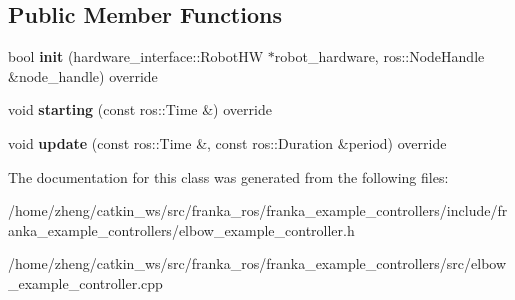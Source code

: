 \subsection*{Public Member Functions}
\begin{DoxyCompactItemize}
\item 
\mbox{\label{classfranka__example__controllers_1_1_elbow_example_controller_ae289eee8c389d5b2d9e2f2cf13fcc475}} 
bool {\bfseries init} (hardware\+\_\+interface\+::\+Robot\+HW $\ast$robot\+\_\+hardware, ros\+::\+Node\+Handle \&node\+\_\+handle) override
\item 
\mbox{\label{classfranka__example__controllers_1_1_elbow_example_controller_a0ed0bd6a0db321eda30ddf0f038021df}} 
void {\bfseries starting} (const ros\+::\+Time \&) override
\item 
\mbox{\label{classfranka__example__controllers_1_1_elbow_example_controller_a0f3e4ef04d7d4eba6019ae68c621a3a0}} 
void {\bfseries update} (const ros\+::\+Time \&, const ros\+::\+Duration \&period) override
\end{DoxyCompactItemize}


The documentation for this class was generated from the following files\+:\begin{DoxyCompactItemize}
\item 
/home/zheng/catkin\+\_\+ws/src/franka\+\_\+ros/franka\+\_\+example\+\_\+controllers/include/franka\+\_\+example\+\_\+controllers/elbow\+\_\+example\+\_\+controller.\+h\item 
/home/zheng/catkin\+\_\+ws/src/franka\+\_\+ros/franka\+\_\+example\+\_\+controllers/src/elbow\+\_\+example\+\_\+controller.\+cpp\end{DoxyCompactItemize}
